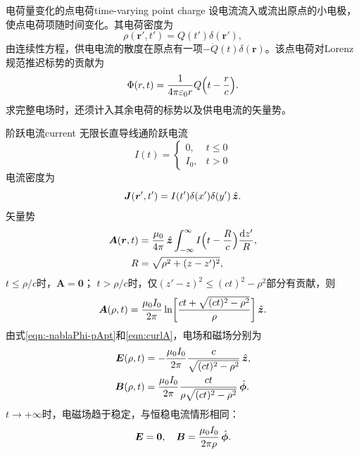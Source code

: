 \begin{example}{电荷量变化的点电荷}{time-varying point charge}
    设电流流入或流出原点的小电极，使点电荷项随时间变化。其电荷密度为
    \[
        \rho(\bm r',t') = Q(t')\delta(\bm r'),
    \]
    由连续性方程，供电电流的散度在原点有一项$-\dot Q(t)\delta(\bm r)$。该点电荷对Lorenz规范推迟标势的贡献为
    \[
        \Phi(r,t) = \frac1{4\pi\varepsilon_0r}Q\Bigl(t - \frac rc\Bigr).
    \]
    求完整电场时，还须计入其余电荷的标势以及供电电流的矢量势。
\end{example}
\begin{example}{阶跃电流}{current}
    无限长直导线通阶跃电流
    \[
        I(t) = \begin{cases}
            0,&t \leqslant 0\\
            I_0,&t > 0
        \end{cases}
    \]
    电流密度为
    \[
        \bm J(\bm r',t') = I(t')\delta(x')\delta(y')\mathop{}\!\hat{\bm{z}}.
    \]
    矢量势
    \begin{align*}
        \bm A(\bm r,t) &= \frac{\mu_0}{4\pi}\mathop{}\!\hat{\bm{z}}\int_{-\infty}^\infty I\Bigl(t - \frac Rc\Bigr)\frac{\mathop{}\!\mathrm{d} z'}R,\\
        R &= \sqrt{\rho^2 + (z - z')^2},
    \end{align*}
    $t \leqslant \rho/c$时，$\bm A = \bm 0$；
    $t > \rho/c$时，仅$(z' - z)^2 \leqslant (ct)^2 - \rho^2$部分有贡献，则
    \[
        \bm A(\rho,t) = \frac{\mu_0I_0}{2\pi}\ln\biggl[\frac{ct + \sqrt{(ct)^2 - \rho^2}}{\rho}\biggr]\mathop{}\!\hat{\bm{z}}.
    \]
    由式\eqref{eqn:-nablaPhi-pApt}和\eqref{eqn:curlA}，电场和磁场分别为
    \begin{subequations}
        \label{eq:ed-switched-wire-fields}
        \begin{align}
            \bm E(\rho,t) &= -\frac{\mu_0I_0}{2\pi}\frac c{\sqrt{(ct)^2 - \rho^2}}\mathop{}\!\hat{\bm{z}},\\
            \bm B(\rho,t) &= \frac{\mu_0I_0}{2\pi}\frac{ct}{\rho\sqrt{(ct)^2 - \rho^2}}\mathop{}\!\hat{\bm{\phi}}.
        \end{align}
    \end{subequations}
    $t \to +\infty$时，电磁场趋于稳定，与恒稳电流情形相同：
    \[
        \bm E = \bm 0,\quad\bm B = \frac{\mu_0I_0}{2\pi\rho}\mathop{}\!\hat{\bm{\phi}}.
    \]
\end{example}
